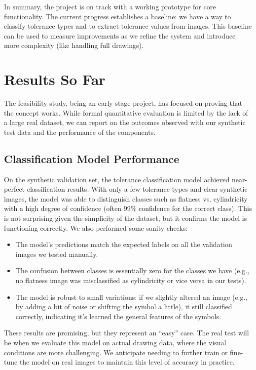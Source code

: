 \documentclass[11pt,a4paper]{article}
\begin{document}
In summary, the project is on track with a working prototype for core functionality. The current progress establishes a baseline: we have a way to classify tolerance types and to extract tolerance values from images. This baseline can be used to measure improvements as we refine the system and introduce more complexity (like handling full drawings).

\section{Results So Far}
The feasibility study, being an early-stage project, has focused on proving that the concept works. While formal quantitative evaluation is limited by the lack of a large real dataset, we can report on the outcomes observed with our synthetic test data and the performance of the components.

\subsection*{Classification Model Performance}
On the synthetic validation set, the tolerance classification model achieved near-perfect classification results. With only a few tolerance types and clear synthetic images, the model was able to distinguish classes such as flatness vs. cylindricity with a high degree of confidence (often 99\% confidence for the correct class). This is not surprising given the simplicity of the dataset, but it confirms the model is functioning correctly. We also performed some sanity checks:
\begin{itemize}
  \item The model’s predictions match the expected labels on all the validation images we tested manually.
  \item The confusion between classes is essentially zero for the classes we have (e.g., no flatness image was misclassified as cylindricity or vice versa in our tests).
  \item The model is robust to small variations: if we slightly altered an image (e.g., by adding a bit of noise or shifting the symbol a little), it still classified correctly, indicating it’s learned the general features of the symbols.
\end{itemize}
These results are promising, but they represent an “easy” case. The real test will be when we evaluate this model on actual drawing data, where the visual conditions are more challenging. We anticipate needing to further train or fine-tune the model on real images to maintain this level of accuracy in practice.
\end{document}
